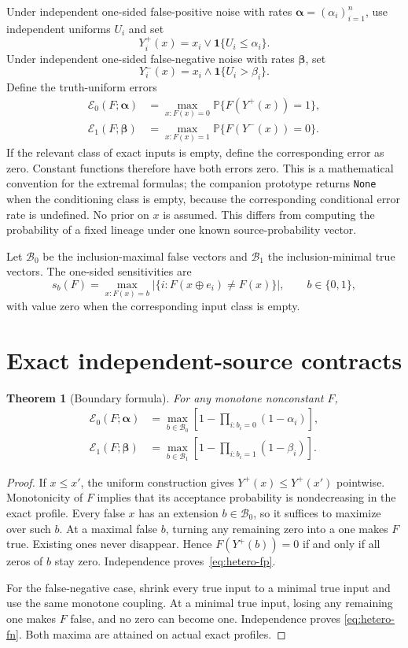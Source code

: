 \documentclass[11pt]{article}
\newtheorem{theorem}{Theorem}
\newcommand{\Prb}{\mathbb P}
\newcommand{\Bzero}{\mathcal B_0}
\newcommand{\Bone}{\mathcal B_1}
\newcommand{\errzero}{\mathcal E_0}
\newcommand{\errone}{\mathcal E_1}
\begin{document}
Under independent one-sided false-positive noise with rates
$\boldsymbol\alpha=(\alpha_i)_{i=1}^n$, use independent uniforms $U_i$ and set
\[
 Y_i^+(x)=x_i\lor\mathbf 1\{U_i\leq\alpha_i\}.
\]
Under independent one-sided false-negative noise with rates
$\boldsymbol\beta$, set
\[
 Y_i^-(x)=x_i\land\mathbf 1\{U_i>\beta_i\}.
\]
Define the truth-uniform errors
\begin{align*}
 \errzero(F;\boldsymbol\alpha)
 &=\max_{x:F(x)=0}\Prb\{F(Y^+(x))=1\},\\
 \errone(F;\boldsymbol\beta)
 &=\max_{x:F(x)=1}\Prb\{F(Y^-(x))=0\}.
\end{align*}
If the relevant class of exact inputs is empty, define the corresponding
error as zero. Constant functions therefore have both errors zero.
This is a mathematical convention for the extremal formulas; the companion
prototype returns \texttt{None} when the conditioning class is empty, because
the corresponding conditional error rate is undefined.
No prior on $x$ is assumed. This differs from computing the probability of a
fixed lineage under one known source-probability vector.

Let $\Bzero$ be the inclusion-maximal false vectors and $\Bone$ the
inclusion-minimal true vectors. The one-sided sensitivities are
\[
 s_b(F)=\max_{x:F(x)=b}
 \bigl|\{i:F(x\mathbin\oplus e_i)\ne F(x)\}\bigr|,
 \qquad b\in\{0,1\},
\]
with value zero when the corresponding input class is empty.

\section{Exact independent-source contracts}

\begin{theorem}[Boundary formula]
For any monotone nonconstant $F$,
\begin{align}
 \errzero(F;\boldsymbol\alpha)
 &=\max_{b\in\Bzero}
 \left[1-\prod_{i:b_i=0}(1-\alpha_i)\right],\label{eq:hetero-fp}\\
 \errone(F;\boldsymbol\beta)
 &=\max_{b\in\Bone}
 \left[1-\prod_{i:b_i=1}(1-\beta_i)\right].\label{eq:hetero-fn}
\end{align}
\end{theorem}

\begin{proof}
If $x\leq x'$, the uniform construction gives
$Y^+(x)\leq Y^+(x')$ pointwise. Monotonicity of $F$ implies that its acceptance
probability is nondecreasing in the exact profile. Every false $x$ has an
extension $b\in\Bzero$, so it suffices to maximize over such $b$.
At a maximal false $b$, turning any remaining zero into a one makes $F$ true.
Existing ones never disappear. Hence $F(Y^+(b))=0$ if and only if all zeros
of $b$ stay zero. Independence proves~\eqref{eq:hetero-fp}.

For the false-negative case, shrink every true input to a minimal true input
and use the same monotone coupling. At a minimal true input, losing any
remaining one makes $F$ false, and no zero can become one. Independence proves
\eqref{eq:hetero-fn}. Both maxima are attained on actual exact profiles.
\end{proof}
\end{document}

